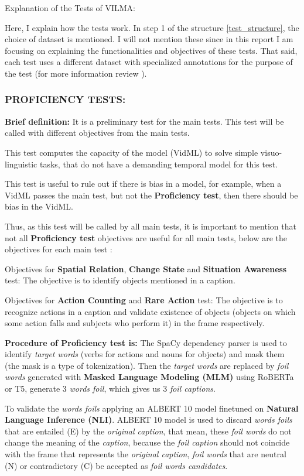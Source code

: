Explanation of the Tests of VILMA:

Here, I explain how the tests work. In step 1 of the structure \ref{test_structure}, the choice of dataset is mentioned. I will not mention these since in this report I am focusing on explaining the functionalities and objectives of these tests. That said, each test uses a different dataset with specialized annotations for the purpose of the test (for more information review \cite{kesen2023ViLMA}).

\subsubsection{PROFICIENCY TESTS:}
\textbf{Brief definition:}
It is a preliminary test for the main tests. This test will be called with different objectives from the main tests.

This test computes the capacity of the model (VidML) to solve simple visuo-linguistic tasks, that do not have a demanding temporal model for this test.

This test is useful to rule out if there is bias in a model, for example, when a VidML passes the main test, but not the \textbf{Proficiency test}, then there should be bias in the VidML.

Thus, as this test will be called by all main tests, it is important to mention that not all \textbf{Proficiency test} objectives are useful for all main tests, below are the objectives for each main test \cite{lei2021clipbert}:

Objectives for \textbf{Spatial Relation}, \textbf{Change State} and \textbf{Situation Awareness} test:
The objective is to identify objects mentioned in a caption.

Objectives for \textbf{Action Counting} and \textbf{Rare Action} test:
The objective is to recognize actions in a caption and validate existence of objects (objects on which some action falls and subjects who perform it) in the frame respectively.

\textbf{Procedure of Proficiency test is:}
The SpaCy dependency parser is used to identify \textit{target words} (verbs for actions and nouns for objects) and mask them (the mask is a type of tokenization). Then the \textit{target words} are replaced by \textit{foil words} generated with \textbf{Masked Language Modeling (MLM)} using RoBERTa or T5, generate 3 \textit{words foil}, which gives us 3 \textit{foil captions}.

To validate the \textit{words foils} applying an ALBERT 10 model finetuned on \textbf{Natural Language Inference (NLI)}. ALBERT 10 model is used to discard \textit{words foils} that are entailed (E) by the \textit{original caption}, that mean, these \textit{foil words} do not change the meaning of the \textit{caption}, because the \textit{foil caption} should not coincide with the frame that represents the \textit{original caption}, \textit{foil words} that are neutral (N) or contradictory (C) be accepted as \textit{foil words candidates}.

